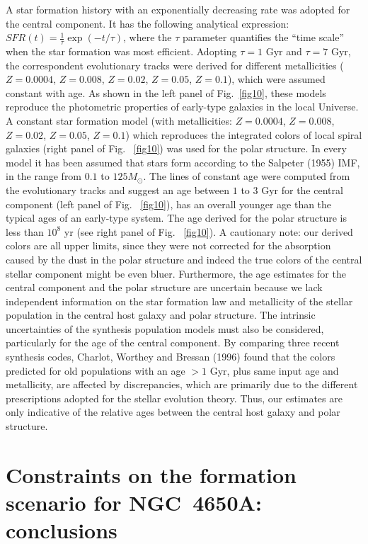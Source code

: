 \documentclass[preprint]{aastex}
\begin{document}
A star formation history with an exponentially decreasing rate was
adopted for the central component. It has 
the following analytical expression: 
$SFR(t)= \frac{1}{\tau} \exp{(- t/ \tau)}$, where
the $\tau$ parameter quantifies the ``time scale'' when the
star formation was most efficient. Adopting $\tau=1$ Gyr and $\tau =7$ Gyr,
the correspondent evolutionary tracks were derived for different 
metallicities ($Z=0.0004$, $Z=0.008$, $Z=0.02$, $Z=0.05$, $Z=0.1$), 
which were assumed constant with age.  
As shown in the left panel of Fig.~\ref{fig10}, 
these models reproduce the photometric properties of early-type 
galaxies in the local Universe.
A constant star formation model (with metallicities: 
$Z=0.0004$, $Z=0.008$, $Z=0.02$, $Z=0.05$, 
$Z=0.1$) which reproduces the integrated colors of local spiral galaxies 
(right panel of Fig.~ \ref{fig10}) was used for the polar structure.
In every model it has been assumed that stars form according to the
Salpeter (1955) IMF, in the range from $0.1$ to $125 M_\odot$.                  
The lines of constant age were computed from the evolutionary tracks and
suggest an age between $1$ to $3$ Gyr for the central component 
(left panel of Fig.~ \ref{fig10}),
has an overall younger age than the typical ages of an early-type system. 
The age derived for the polar structure is less than $10^8$ yr  
(see right panel of Fig.~ \ref{fig10}).
A cautionary note: our derived colors are all upper limits, since they 
were not corrected for the absorption caused by the dust in the polar
structure and indeed the true colors of the central stellar component
might be even bluer. Furthermore, the age estimates for the central component and
the polar structure are uncertain because we lack
independent information on the star formation law and metallicity
of the stellar population in the central host galaxy and polar structure.
The intrinsic uncertainties of the synthesis population models must
also be considered, particularly for the age of the central component.
By comparing three recent synthesis codes, Charlot, Worthey and
Bressan (1996) found that the colors predicted for old populations with
an age $>1$ Gyr,
plus same input age and metallicity, are affected by
discrepancies, which are primarily due to the different prescriptions  
adopted for the stellar evolution theory.
Thus, our estimates are only indicative of the relative ages between the
central host galaxy and polar structure.


\section{Constraints on the formation scenario for NGC~4650A: 
conclusions }\label{formation}
\end{document}
